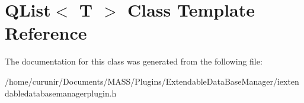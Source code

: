 \hypertarget{class_q_list}{}\section{Q\+List$<$ T $>$ Class Template Reference}
\label{class_q_list}


The documentation for this class was generated from the following file\+:\begin{DoxyCompactItemize}
\item 
/home/curunir/\+Documents/\+M\+A\+S\+S/\+Plugins/\+Extendable\+Data\+Base\+Manager/iextendabledatabasemanagerplugin.\+h\end{DoxyCompactItemize}

